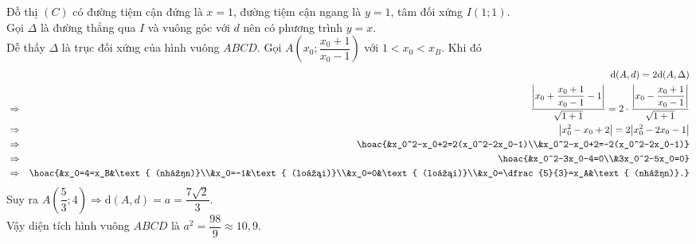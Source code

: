 \begin{ex}
{\begin{center}
	\end{center}
	Đồ thị $(C)$ có đường tiệm cận đứng là $x=1$, đường tiệm cận ngang là $y=1$, tâm đối xứng $I(1;1)$.\\
	Gọi $\Delta$ là đường thẳng qua $I$ và vuông góc với $d$ nên có phương trình $y=x$.\\
	Dễ thấy $\Delta$ là trục đối xứng của hình vuông $ABCD$. Gọi $A\left(x_0;\dfrac{x_0+1}{x_0-1}\right)$ với $1<x_0<x_B$. Khi đó
	\allowdisplaybreaks
	\begin{eqnarray*}
		&&\mathrm{d}(A,d)=2\mathrm{d}(A,\Delta)\\
		&\Rightarrow&\dfrac{\left|x_0+\dfrac{x_0+1}{x_0-1}-1\right|}{\sqrt{1+1}}=2\cdot \dfrac{\left|x_0-\dfrac{x_0+1}{x_0-1}\right|}{\sqrt{1+1}}\\
		&\Rightarrow&\big|x_0^2-x_0+2\big|=2\big|x_0^2-2x_0-1\big|\\
		&\Rightarrow&\hoac{&x_0^2-x_0+2=2(x_0^2-2x_0-1)\\&x_0^2-x_0+2=-2(x_0^2-2x_0-1)}\\
		&\Rightarrow&\hoac{&x_0^2-3x_0-4=0\\&3x_0^2-5x_0=0}\\
		&\Rightarrow&\hoac{&x_0=4=x_B&\text{ (nhận)}\\&x_0=-1&\text{ (loại)}\\&x_0=0&\text{ (loại)}\\&x_0=\dfrac{5}{3}=x_A&\text{ (nhận)}.}
	\end{eqnarray*}
	Suy ra $A\left(\dfrac{5}{3}; 4\right)\Rightarrow \mathrm{d}(A,d)= a=\dfrac{7\sqrt{2}}{3}$.\\
	Vậy diện tích hình vuông $ABCD$ là $a^2=\dfrac{98}{9}\approx 10{,}9$.
	}
\end{ex}

%

